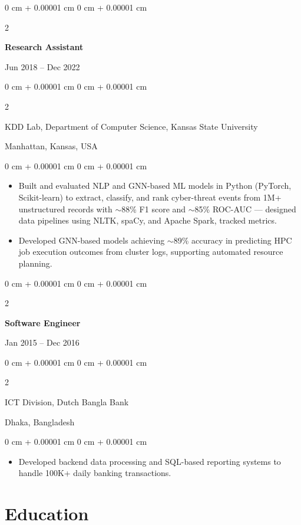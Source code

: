 \documentclass[10pt, letterpaper]{article}
\newenvironment{highlights}{
    \begin{itemize}[
        topsep=0.10 cm,
        parsep=0.10 cm,
        partopsep=0pt,
        itemsep=0pt,
        leftmargin=0 cm + 10pt
    ]
}{
    \end{itemize}
} %
\newenvironment{onecolentry}{
    \begin{adjustwidth}{
        0 cm + 0.00001 cm
    }{
        0 cm + 0.00001 cm
    }
}{
    \end{adjustwidth}
} %
\newenvironment{twocolentry}[2][]{
    \onecolentry
    \def\secondColumn{#2}
    \setcolumnwidth{\fill, 4.5 cm}
    \begin{paracol}{2}
}{
    \switchcolumn \raggedleft \secondColumn
    \end{paracol}
    \endonecolentry
} %
\begin{document}
    \vspace{1mm}

    \begin{twocolentry}{Jun 2018 -- Dec 2022}
        \textbf{Research Assistant}
    \end{twocolentry}
    \begin{twocolentry}{Manhattan, Kansas, USA}
       KDD Lab, Department of Computer Science, Kansas State University
    \end{twocolentry}
    \vspace{0.10 cm}
    \begin{onecolentry}
        \begin{highlights}
            \item Built and evaluated NLP and GNN-based ML models in Python (PyTorch, Scikit-learn) to extract, classify, and rank cyber-threat events from 1M+ unstructured records with $\sim$88\% F1 score and $\sim$85\% ROC-AUC — designed data pipelines using NLTK, spaCy, and Apache Spark, tracked metrics.
            \item Developed GNN-based models achieving $\sim$89\% accuracy in predicting HPC job execution outcomes from cluster logs, supporting automated resource planning.
        \end{highlights}
    \end{onecolentry}

    \vspace{0.1 cm}
    \begin{twocolentry}{Jan 2015 -- Dec 2016}
        \textbf{Software Engineer}
    \end{twocolentry}
    \begin{twocolentry}{Dhaka, Bangladesh}
       ICT Division, Dutch Bangla Bank
    \end{twocolentry}

    \begin{onecolentry}
        \begin{highlights}
            \item Developed backend data processing and SQL-based reporting systems to handle 100K+ daily banking transactions.
        \end{highlights}
    \end{onecolentry}

\vspace{-1.5mm}
\section{Education}
\end{document}
